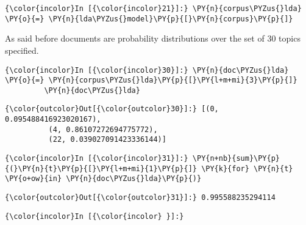     \begin{Verbatim}[commandchars=\\\{\}]
{\color{incolor}In [{\color{incolor}21}]:} \PY{n}{corpus\PYZus{}lda} \PY{o}{=} \PY{n}{lda\PYZus{}model}\PY{p}{[}\PY{n}{corpus}\PY{p}{]}
\end{Verbatim}

    As said before documents are probability distributions over the set of
30 topics specified.

    \begin{Verbatim}[commandchars=\\\{\}]
{\color{incolor}In [{\color{incolor}30}]:} \PY{n}{doc\PYZus{}lda} \PY{o}{=} \PY{n}{corpus\PYZus{}lda}\PY{p}{[}\PY{l+m+mi}{3}\PY{p}{]}
         \PY{n}{doc\PYZus{}lda}
\end{Verbatim}

            \begin{Verbatim}[commandchars=\\\{\}]
{\color{outcolor}Out[{\color{outcolor}30}]:} [(0, 0.095488416923020167),
          (4, 0.86107272694775772),
          (22, 0.039027091423336144)]
\end{Verbatim}
        
    \begin{Verbatim}[commandchars=\\\{\}]
{\color{incolor}In [{\color{incolor}31}]:} \PY{n+nb}{sum}\PY{p}{(}\PY{n}{t}\PY{p}{[}\PY{l+m+mi}{1}\PY{p}{]} \PY{k}{for} \PY{n}{t} \PY{o+ow}{in} \PY{n}{doc\PYZus{}lda}\PY{p}{)}
\end{Verbatim}

            \begin{Verbatim}[commandchars=\\\{\}]
{\color{outcolor}Out[{\color{outcolor}31}]:} 0.995588235294114
\end{Verbatim}
        
    \begin{Verbatim}[commandchars=\\\{\}]
{\color{incolor}In [{\color{incolor} }]:} 
\end{Verbatim}


    
    
    
    